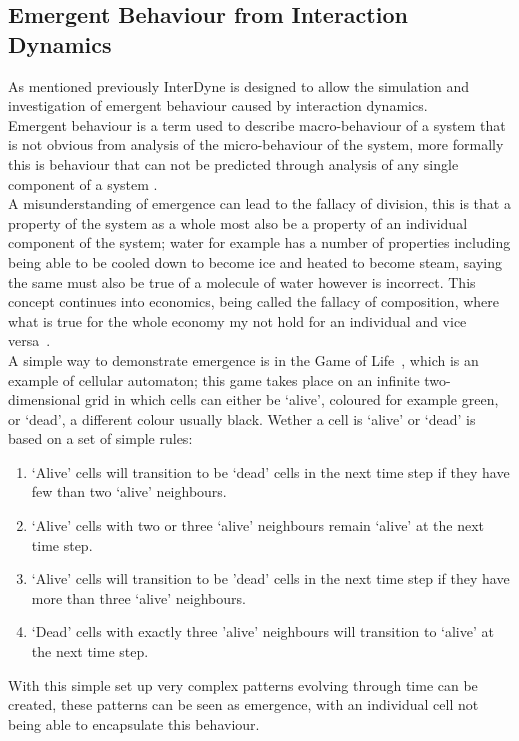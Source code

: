 \documentclass{article}
\begin{document}
\subsection{Emergent Behaviour from Interaction Dynamics}
As mentioned previously InterDyne is designed to allow the simulation and investigation of emergent behaviour caused by interaction dynamics.\\ 
Emergent behaviour is a term used to describe macro-behaviour of a system that is not obvious from analysis of the micro-behaviour of the system, more formally this is behaviour that can not be predicted through analysis of any single component of a system \cite{EB_systemofsystemsGLangford}.\\
A misunderstanding of emergence can lead to the fallacy of division, this is that a property of the system as a whole most also be a property of an individual component of the system; water for example has a number of properties including being able to be cooled down to become ice and heated to become steam, saying the same must also be true of a molecule of water however is incorrect. This concept continues into economics, being called the fallacy of composition, where what is true for the whole economy my not hold for an individual and vice versa~\cite{fallacyofcompostionBook}.\\       
A simple way to demonstrate emergence is in the Game of Life~\cite{gameoflifepage}, which is an example of cellular automaton; this game takes place on an infinite two-dimensional grid in which cells can either be `alive', coloured for example green, or `dead', a different colour usually black. Wether a cell is `alive' or `dead' is based on a set of simple rules:   
\begin{enumerate}
  \item `Alive' cells will transition to be `dead' cells in the next time step if they have few than two `alive' neighbours.
  \item `Alive' cells with two or three `alive' neighbours remain `alive' at the next time step.
  \item `Alive' cells will transition to be 'dead' cells in the next time step if they have more than three `alive' neighbours.
  \item `Dead' cells with exactly three 'alive' neighbours will transition to `alive' at the next time step.
\end{enumerate}
With this simple set up very complex patterns evolving through time can be created, these patterns can be seen as emergence, with an individual cell not being able to encapsulate this behaviour.\\
\end{document}
